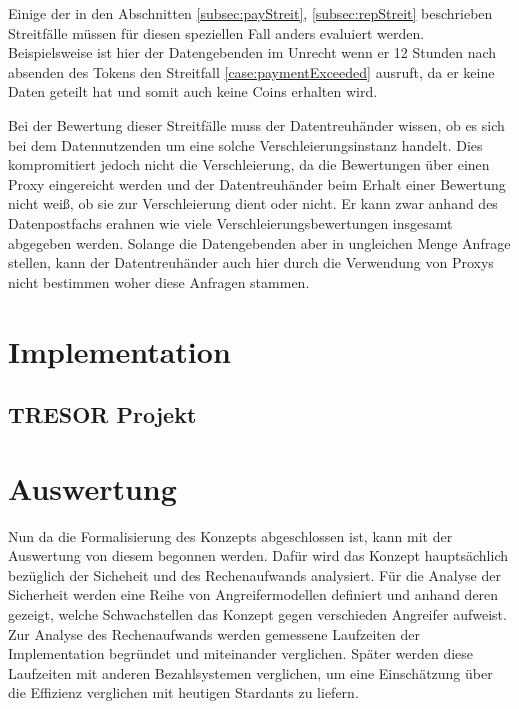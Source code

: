 \documentclass{scrreprt}
\begin{document}
Einige der in den Abschnitten \ref{subsec:payStreit}, \ref{subsec:repStreit} beschrieben Streitfälle müssen für diesen speziellen Fall anders evaluiert werden. Beispielsweise ist hier der Datengebenden im Unrecht wenn er 12 Stunden nach absenden des Tokens den Streitfall \ref{case:paymentExceeded} ausruft, da er keine Daten geteilt hat und somit auch keine Coins erhalten wird.

Bei der Bewertung dieser Streitfälle muss der Datentreuhänder wissen, ob es sich bei dem Datennutzenden um eine solche Verschleierungsinstanz handelt. Dies kompromitiert jedoch nicht die Verschleierung, da die Bewertungen über einen Proxy eingereicht werden und der Datentreuhänder beim Erhalt einer Bewertung nicht weiß, ob sie zur Verschleierung dient oder nicht. Er kann zwar anhand des Datenpostfachs erahnen wie viele Verschleierungsbewertungen insgesamt abgegeben werden. Solange die Datengebenden aber in ungleichen Menge Anfrage stellen, kann der Datentreuhänder auch hier durch die Verwendung von Proxys nicht bestimmen woher diese Anfragen stammen.




\chapter{Implementation}
\label{chap:impl}


\section{TRESOR Projekt}


\chapter{Auswertung}
\label{chap:auswertung}
Nun da die Formalisierung des Konzepts abgeschlossen ist, kann mit der Auswertung von diesem begonnen werden. Dafür wird das Konzept hauptsächlich bezüglich der Sicheheit und des Rechenaufwands analysiert. Für die Analyse der Sicherheit werden eine Reihe von Angreifermodellen definiert und anhand deren gezeigt, welche Schwachstellen das Konzept gegen verschieden Angreifer aufweist. Zur Analyse des Rechenaufwands werden gemessene Laufzeiten der Implementation begründet und miteinander verglichen. Später werden diese Laufzeiten mit anderen Bezahlsystemen verglichen, um eine Einschätzung über die Effizienz verglichen mit heutigen Stardants zu liefern.
\end{document}
